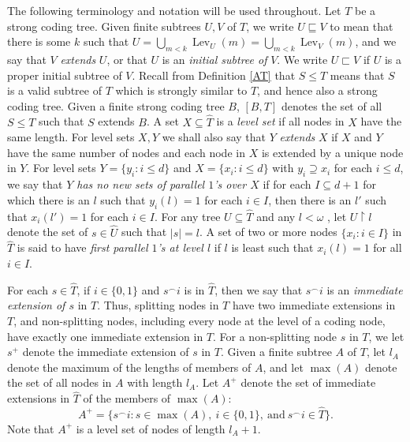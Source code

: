 \documentclass{amsart}
\theoremstyle{remark}
\theoremstyle{definition}
\theoremstyle{remark}
\newcommand{\om}{\omega}
\newcommand{\sse}{\subseteq}
\newcommand{\contains}{\supseteq}
\DeclareMathOperator{\Lev}{Lev}
\newcommand{\re}{\restriction}
\begin{document}
The following terminology and notation will be used throughout.
Let $T$ be a strong coding  tree.
Given finite subtrees $U,V$ of $T$,
we write $U\sqsubseteq V$ to mean that
there is some $k$ such that $U=\bigcup_{m<k}\Lev_U(m)=\bigcup_{m<k}\Lev_V(m)$,
and we say that $V$ {\em extends} $U$, or that $U$ is an {\em initial subtree of} $V$.
We write $U\sqsubset V$ if $U$ is a proper initial subtree of $V$.
Recall
from Definition \ref{AT}
that
$S\le T$ means that $S$ is a valid subtree of $T$
which is  strongly similar to $T$, and hence also a strong coding tree.
Given a finite strong coding tree $B$,
 $[B,T]$ denotes the set of all   $S\le T$ such that  $S$ extends $B$.
A set $X\sse \widehat{T}$ is a {\em level set} if all nodes in $X$ have the same length.
For level sets $X,Y$ we shall also say that $Y$ {\em extends} $X$ if $X$ and $Y$ have the same number of nodes and each node in
$X$ is extended by a unique node in
$Y$.
For level sets $Y=\{y_i:i\le d\}$ and $X=\{x_i:i\le d\}$
with $y_i\contains x_i$ for each $i\le d$,
we say that {\em $Y$ has no new sets of parallel $1$'s over $X$}
if for each $I\sse d+1$ for which there is an $l$ such that $y_i(l)=1$ for each $i\in I$,
then there is an $l'$ such that $x_i(l')=1$ for each $i\in I$.
For
any tree $U\sse\widehat{T}$ and  any $l<\om$ , let
$U\re l$ denote the set of $s\in \widehat{U}$ such that $|s|=l$.
A set of two or more nodes $\{x_i:i\in I\}$
  in $\widehat{T}$ is said to have {\em first parallel $1$'s at level $l$} if $l$ is least such that $x_i(l)=1$ for all $i\in I$.


For each $s\in \widehat{T}$, if $i\in\{0,1\}$ and $s^{\frown}i$ is in $\widehat{T}$, then we say that $s^{\frown}i$ is an {\em immediate extension of $s$} in $T$.
Thus, splitting nodes in $T$ have two immediate extensions in $T$, and non-splitting nodes, including every node at the level of a coding node, have exactly one immediate extension in $T$.
For a non-splitting node $s$ in $T$, we let $s^+$ denote the immediate extension of $s$ in $T$.
Given a finite subtree $A$ of $T$, let  $l_A$ denote the maximum of
the lengths of members of $A$,
 and let $\max(A)$ denote the set of all nodes in $A$  with length $l_A$.
Let $A^+$ denote the set of   immediate extensions in $\widehat{T}$ of the members of $\max(A)$:
\begin{equation}
A^+=\{s^{\frown}i : s\in \max(A),\ i\in\{0,1\},\mathrm{\ and\ } s^{\frown}i\in \widehat{T}\}.
\end{equation}
Note that $A^+$ is a level set of nodes of length $l_A+1$.
\end{document}
